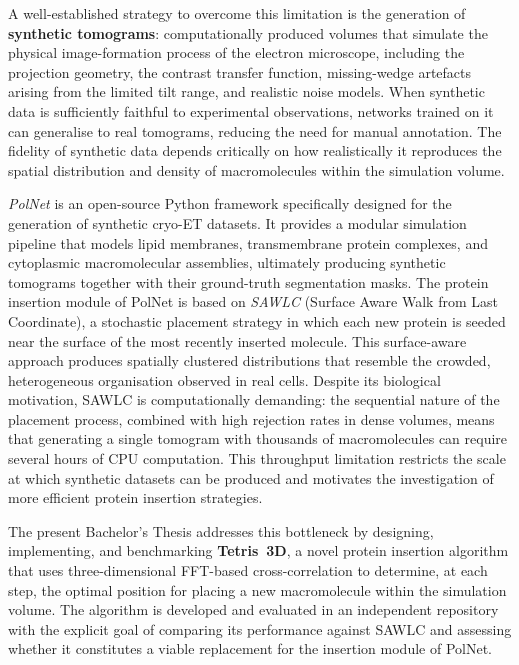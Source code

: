 A well-established strategy to overcome this limitation is the generation of \textbf{synthetic
tomograms}: computationally produced volumes that simulate the physical image-formation process
of the electron microscope, including the projection geometry, the contrast transfer function,
missing-wedge artefacts arising from the limited tilt range, and realistic noise models.
When synthetic data is sufficiently faithful to experimental observations, networks trained on it
can generalise to real tomograms, reducing the need for manual annotation. The fidelity of
synthetic data depends critically on how realistically it reproduces the spatial distribution
and density of macromolecules within the simulation volume.

\textit{PolNet} is an open-source Python framework specifically designed for the generation of
synthetic cryo-ET datasets. It provides a modular simulation pipeline that models lipid membranes,
transmembrane protein complexes, and cytoplasmic macromolecular assemblies, ultimately producing
synthetic tomograms together with their ground-truth segmentation masks. The protein insertion
module of PolNet is based on \textit{SAWLC} (Surface Aware Walk from Last Coordinate), a stochastic
placement strategy in which each new protein is seeded near the surface of the most recently
inserted molecule. This surface-aware approach produces spatially clustered distributions that
resemble the crowded, heterogeneous organisation observed in real cells. Despite its biological
motivation, SAWLC is computationally demanding: the sequential nature of the placement process,
combined with high rejection rates in dense volumes, means that generating a single tomogram with
thousands of macromolecules can require several hours of CPU computation. This throughput limitation
restricts the scale at which synthetic datasets can be produced and motivates the investigation of
more efficient protein insertion strategies.

The present Bachelor's Thesis addresses this bottleneck by designing, implementing, and
benchmarking \textbf{Tetris~3D}, a novel protein insertion algorithm that uses three-dimensional
FFT-based cross-correlation to determine, at each step, the optimal position for placing a new
macromolecule within the simulation volume. The algorithm is developed and evaluated in an
independent repository with the explicit goal of comparing its performance against SAWLC and
assessing whether it constitutes a viable replacement for the insertion module of PolNet.

